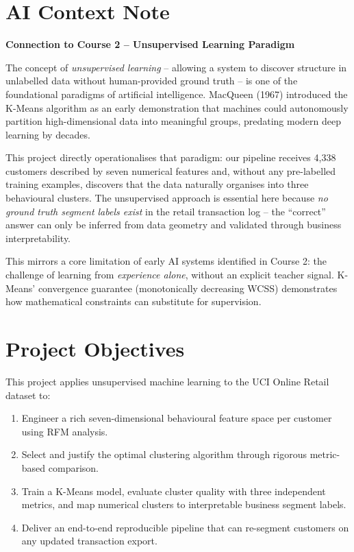 \documentclass[12pt,a4paper]{report}
\begin{document}
\section{AI Context Note}

\begin{infobox}
\textbf{Connection to Course 2 -- Unsupervised Learning Paradigm}
\end{infobox}

The concept of \emph{unsupervised learning} -- allowing a system to discover structure in unlabelled data without human-provided ground truth -- is one of the foundational paradigms of artificial intelligence. MacQueen (1967) introduced the K-Means algorithm as an early demonstration that machines could autonomously partition high-dimensional data into meaningful groups, predating modern deep learning by decades.

This project directly operationalises that paradigm: our pipeline receives 4,338 customers described by seven numerical features and, without any pre-labelled training examples, discovers that the data naturally organises into three behavioural clusters. The unsupervised approach is essential here because \emph{no ground truth segment labels exist} in the retail transaction log -- the ``correct'' answer can only be inferred from data geometry and validated through business interpretability.

This mirrors a core limitation of early AI systems identified in Course 2: the challenge of learning from \emph{experience alone}, without an explicit teacher signal. K-Means' convergence guarantee (monotonically decreasing WCSS) demonstrates how mathematical constraints can substitute for supervision.

\section{Project Objectives}

This project applies unsupervised machine learning to the UCI Online Retail dataset to:
\begin{enumerate}[leftmargin=1.8em]
  \item Engineer a rich seven-dimensional behavioural feature space per customer using RFM analysis.
  \item Select and justify the optimal clustering algorithm through rigorous metric-based comparison.
  \item Train a K-Means model, evaluate cluster quality with three independent metrics, and map numerical clusters to interpretable business segment labels.
  \item Deliver an end-to-end reproducible pipeline that can re-segment customers on any updated transaction export.
\end{enumerate}
\end{document}
